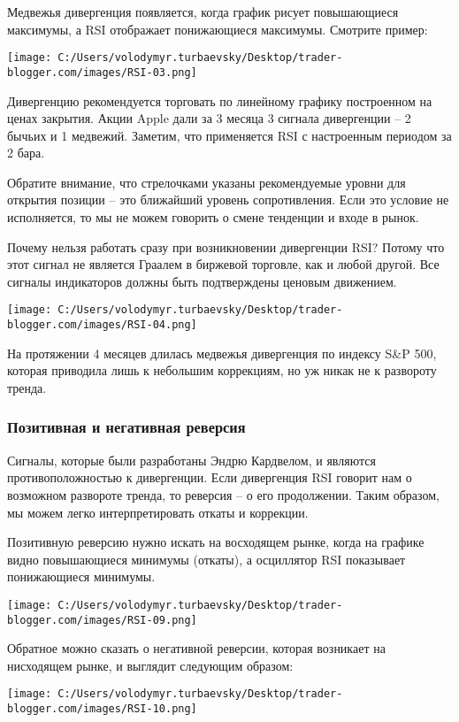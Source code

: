 \documentclass[a5paper]{article}
\begin{document}
Медвежья дивергенция появляется, когда график рисует повышающиеся
максимумы, а RSI отображает понижающиеся максимумы. Смотрите пример:

\texttt{[image: C:/Users/volodymyr.turbaevsky/Desktop/trader-blogger.com/images/RSI-03.png]}

Дивергенцию рекомендуется торговать по линейному графику построенном на ценах закрытия. Акции Apple дали за 3 месяца 3 сигнала дивергенции – 2 бычьих и 1 медвежий. Заметим, что применяется RSI с настроенным периодом за 2 бара.

Обратите внимание, что стрелочками указаны рекомендуемые уровни для открытия позиции – это ближайший уровень сопротивления. Если это условие не исполняется, то мы не можем говорить о смене тенденции и входе в рынок.

Почему нельзя работать сразу при возникновении дивергенции RSI? Потому
что этот сигнал не является Граалем в биржевой торговле, как и любой
другой. Все сигналы индикаторов должны быть подтверждены ценовым
движением.

\texttt{[image: C:/Users/volodymyr.turbaevsky/Desktop/trader-blogger.com/images/RSI-04.png]}

На протяжении 4 месяцев длилась медвежья дивергенция по индексу S\&P
500, которая приводила лишь к небольшим коррекциям, но уж никак не к
развороту тренда.

\subsubsection{Позитивная и негативная реверсия}

Сигналы, которые были разработаны Эндрю Кардвелом, и являются противоположностью к дивергенции. Если дивергенция RSI говорит нам о возможном развороте тренда, то реверсия – о его продолжении. Таким образом, мы можем легко интерпретировать откаты и коррекции.

Позитивную реверсию нужно искать на восходящем рынке, когда на графике видно повышающиеся минимумы (откаты), а осциллятор RSI показывает понижающиеся минимумы.

\texttt{[image: C:/Users/volodymyr.turbaevsky/Desktop/trader-blogger.com/images/RSI-09.png]}

Обратное можно сказать о негативной реверсии, которая возникает на нисходящем рынке, и выглядит следующим образом:

\texttt{[image: C:/Users/volodymyr.turbaevsky/Desktop/trader-blogger.com/images/RSI-10.png]}
\end{document}
